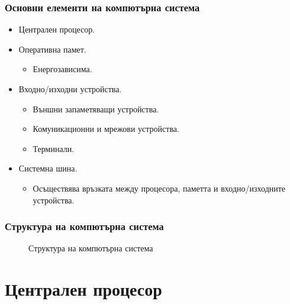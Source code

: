 \documentclass[ignorenonframetext, hyperref=unicode]{beamer}
\begin{document}
\begin{frame}
\frametitle{Основни елементи на компютърна система}
\begin{itemize}
\item Централен процесор.
\item Оперативна памет.
\begin{itemize}
  \item Енергозависима.
\end{itemize}
\item Входно/изходни устройства.
\begin{itemize}
  \item Външни запаметяващи устройства.
  \item Комуникационни и мрежови устройства.
  \item Терминали.
\end{itemize}
\item Системна шина.
\begin{itemize}
  \item Осъществява връзката между процесора, паметта и входно/изходните
  устройства.
\end{itemize}
\end{itemize}
\end{frame}


\begin{frame}
\frametitle{Структура на компютърна система}
\begin{figure}[h]
\center
{}
\caption{Структура на компютърна система}
\end{figure}
\end{frame}


\section{Централен процесор}
\end{document}
